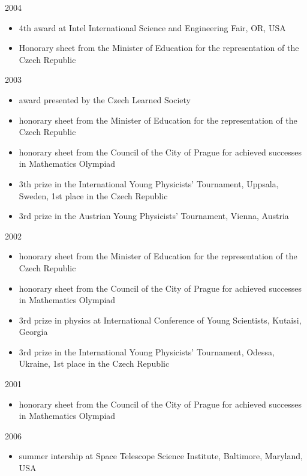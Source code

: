 \documentclass[a4paper,10pt]{article}
\newenvironment{packedenum}{
\begin{itemize}
  \setlength{\itemsep}{0pt}
  \setlength{\parskip}{0pt}
  \setlength{\parsep}{0pt}
}{\end{itemize}}
\begin{document}

2004
\begin{packedenum}
\item 4th award at Intel International Science and Engineering Fair, OR, USA
\item Honorary sheet from the Minister of Education for the representation
  of the Czech Republic
\end{packedenum}

{2003}
\begin{packedenum}
\item award presented by the Czech Learned Society
\item honorary sheet from the Minister of Education for the representation
  of the Czech Republic
\item honorary sheet from the Council of the City of Prague for achieved
  successes in Mathematics Olympiad
\item 3th prize in the International Young Physicists' Tournament, Uppsala,
  Sweden, 1st place in the Czech Republic
\item 3rd prize in the Austrian Young Physicists' Tournament, Vienna, Austria
\end{packedenum}

{2002}
\begin{packedenum}
\item honorary sheet from the Minister of Education for the representation
  of the Czech Republic
\item honorary sheet from the Council of the City of Prague for achieved
  successes in Mathematics Olympiad
\item 3rd prize in physics at International Conference of Young Scientists,
  Kutaisi, Georgia
\item 3rd prize in the International Young Physicists' Tournament, Odessa,
  Ukraine, 1st place in the Czech Republic
\end{packedenum}

{2001}
\begin{packedenum}
\item honorary sheet from the Council of the City of Prague for achieved
  successes in Mathematics Olympiad
\end{packedenum}


{2006}
\begin{packedenum}
\item summer intership at Space Telescope Science Institute, Baltimore, Maryland,
  USA
\end{packedenum}
\end{document}
